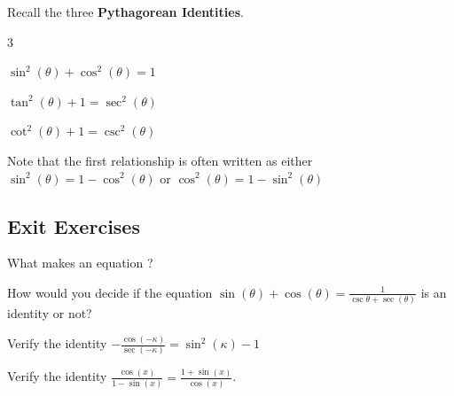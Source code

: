 \begin{myDefinition}
	
	Recall the three \textbf{Pythagorean Identities}.
	\begin{itemize}
	\end{itemize}
	Note that the first relationship is often written as either $\sin^2(\theta)=1-\cos^2(\theta)$ or $\cos^2(\theta)=1-\sin^2(\theta)$
\end{myDefinition}

\newpage

\subsection*{Exit Exercises} \label{exit-supplement-exercises-section-trig-identities}

\begin{myExit}
	What makes an equation ?
	\vfill
\end{myExit}

\begin{myExit}
	How would you decide if the equation $\sin(\theta)+\cos(\theta)=\frac{1}{\csc{\theta}+\sec(\theta)}$ is an identity or not? 
	\vfill
\end{myExit}

\begin{myExit}
	Verify the identity $-\frac{\cos(-\kappa)}{\sec(-\kappa)}=\sin^2(\kappa)-1$
	\vfill
	\vfill
	\vfill
\end{myExit}

\begin{myExit}
	Verify the identity $\frac{\cos(x)}{1-\sin(x)}=\frac{1+\sin(x)}{\cos(x)}$.
	\vfill
	\vfill
	\vfill
\end{myExit}

